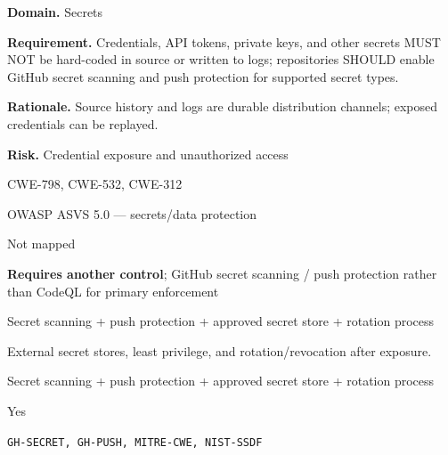 \documentclass[10pt,letterpaper]{article}
\newcommand{\prioritybadge}[2]{\tcbox[on line,boxrule=0pt,arc=1.2mm,boxsep=0.7mm,left=1mm,right=1mm,top=0.4mm,bottom=0.4mm,colback=#2!12,coltext=#2]{\scriptsize\bfseries #1}}
\begin{document}
\begin{rulebox}[title={\texttt{SCS-ALL-SECRET-001} \hfill \prioritybadge{Critical Control}{Critical}}]
\textbf{Domain.} Secrets

\textbf{Requirement.} Credentials, API tokens, private keys, and other secrets MUST NOT be hard-coded in source or written to logs; repositories SHOULD enable GitHub secret scanning and push protection for supported secret types.

\textbf{Rationale.} Source history and logs are durable distribution channels; exposed credentials can be replayed.

\textbf{Risk.} Credential exposure and unauthorized access

\begin{description}[leftmargin=2.65cm,labelwidth=2.3cm,style=nextline,itemsep=1pt,topsep=3pt]
  \item[CWE] CWE-798, CWE-532, CWE-312
  \item[OWASP] OWASP ASVS 5.0 --- secrets/data protection
  \item[CERT] Not mapped
  \item[CodeQL] \textbf{Requires another control}; GitHub secret scanning / push protection rather than CodeQL for primary enforcement
  \item[Enforcement] Secret scanning + push protection + approved secret store + rotation process
  \item[Prevention] External secret stores, least privilege, and rotation/revocation after exposure.
  \item[Verification] Secret scanning + push protection + approved secret store + rotation process
  \item[Automation] Yes
  \item[Sources] \texttt{GH-SECRET, GH-PUSH, MITRE-CWE, NIST-SSDF}
\end{description}
\end{rulebox}
\end{document}
